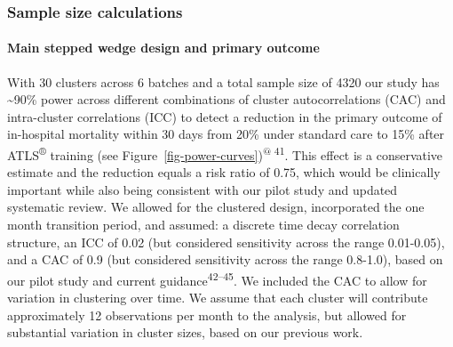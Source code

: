 \documentclass[
]{scrartcl}
\let\oldparagraph\paragraph
\renewcommand{\paragraph}[1]{\oldparagraph{#1}\mbox{}}
\begin{document}
\hypertarget{sample-size-calculations}{%
\subsubsection{Sample size
calculations}\label{sample-size-calculations}}

\hypertarget{main-stepped-wedge-design-and-primary-outcome}{%
\paragraph{Main stepped wedge design and primary
outcome}\label{main-stepped-wedge-design-and-primary-outcome}}

With 30 clusters across 6 batches and a total sample size of 4320 our
study has \textasciitilde90\% power across different combinations of
cluster autocorrelations (CAC) and intra-cluster correlations (ICC) to
detect a reduction in the primary outcome of in-hospital mortality
within 30 days from 20\% under standard care to 15\% after
ATLS\textsuperscript{®} training (see
Figure~\ref{fig-power-curves})\textsuperscript{@ 41}. This effect is a
conservative estimate and the reduction equals a risk ratio of 0.75,
which would be clinically important while also being consistent with our
pilot study and updated systematic review. We allowed for the clustered
design, incorporated the one month transition period, and assumed: a
discrete time decay correlation structure, an ICC of 0.02 (but
considered sensitivity across the range 0.01-0.05), and a CAC of 0.9
(but considered sensitivity across the range 0.8-1.0), based on our
pilot study and current guidance\textsuperscript{42--45}. We included
the CAC to allow for variation in clustering over time. We assume that
each cluster will contribute approximately 12 observations per month to
the analysis, but allowed for substantial variation in cluster sizes,
based on our previous work.
\end{document}
